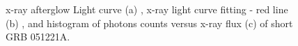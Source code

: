 \begin{figure}[hpbt]
\caption{x-ray  afterglow Light curve (a) , x-ray  light curve fitting - red line (b) , and histogram  of  photons counts  versus x-ray flux  (c)  of short GRB 051221A.}
\end{figure}

